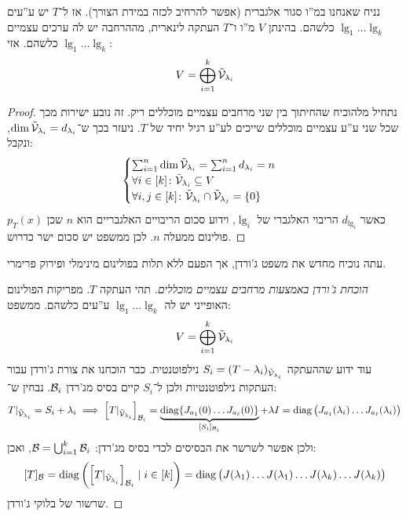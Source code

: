 \documentclass[name=רשימות אלגברה לינארית 2א]{../../../tex/classes/megasumPreamble}
\begin{document}
	
	
	\begin{Theorem}
		נניח שאנחנו במ''ו סגור אלגברית (אפשר להרחיב לכזה במידת הצורך). אז ל־$T$ יש ע''עים $\lg_1 \dots \lg_k$ כלשהם. בהינתן $V$ מ''ו ו־$T$ העתקה לינארית, מההרחבה יש לה ערכים עצמיים $\lg_1 \dots \lg_k$ כלשהם. אזי: 
		\[ V = \bigoplus_{i = 1}^{k} \tilde {\mathcal{V}}_{\lambda_i} \]
	\end{Theorem}
	\begin{proof}
		נתחיל מלהוכיח שהחיתוך בין שני מרחבים עצמיים מוכללים ריק. זה נובע ישירות מכך שכל שני ע''ע עצמיים מוכללים שייכים לע''ע רגיל יחיד של $T$. ניעזר בכך ש־$\dim \tilde {\mathcal{V}}_{\lambda_i} = d_{\lambda_i}$, ונקבל: 
		\[ \begin{cases}
			\sum_{i = 1}^{n} \dim \tilde {\mathcal{V}}_{\lambda_i} = \sum_{i = 1}^{n} d_{\lambda_i} = n \\
			\forall i \in [k] \colon \tilde {\mathcal{V}}_{\lambda_i} \subseteq V \\
			\forall i, j \in [k] \colon \tilde {\mathcal{V}}_{\lambda_i} \cap \tilde {\mathcal{V}}_{\lambda_j} = \{0\}
		\end{cases} \]
		כאשר $d_{\lg_i}$ הריבוי האלגברי של $\lg_i$, וידוע סכום הריבויים האלגבריים הוא $n$ שכן $p_T(x)$ פולינום ממעלה $n$. לכן ממשפט יש סכום ישר כדרוש. 
	\end{proof}
	
	עתה נוכיח מחדש את משפט ג'ורדן, אך הפעם ללא תלות בפולינום מינימלי ופירוק פרימרי. 
	\begin{proof}[הוכחת ג'ורדן באמצעות מרחבים עצמיים מוכללים]
		תהי העתקה $T$. מפריקות הפולינום האופייני יש לה $\lg_1 \dots \lg_k$ ע''עים כלשהם. ממשפט: 
		\[ V = \bigoplus_{i = 1}^{k} \tilde {\mathcal{V}}_{\lambda_i} \]
		עוד ידוע שההעתקה $S_i = (T - \lambda_i)_{\tilde {\mathcal{V}}_{\lambda_i}}$ נילפוטנטית. כבר הוכחנו את צורת ג'ורדן עבור העתקות נילפוטנטיות ולכן ל־$S_i$ קיים בסיס מג'רדן $\mathcal{B}_i$. נבחין ש־: 
		\[ T|_{\tilde {\mathcal{V}}_{\lambda_i}} = S_i + \lambda_i \implies \left [ T|_{\tilde {\mathcal{V}}_{\lambda_i}} \right ]_{\mathcal{B}_i} = \underbrace{\operatorname{diag}\{J_{a_1}(0) \dots J_{a_\ell}(0)\}}_{[S_i]_{\mathcal{B}_i}} + \lambda I = \operatorname{diag}\big(J_{a_1}(\lambda_i) \dots J_{a_\ell}(\lambda_i)\big) \]
		ולכן אפשר לשרשר את הבסיסים לכדי בסיס מג'רדן: $\mathcal{B} = \bigcup_{i = 1}^{k} \mathcal{B}_i$, ואכן: 
		\[ [T]_{\mathcal{B}} = \operatorname{diag}\left ( \left [ T|_{\tilde {\mathcal{V}}_{\lambda_i}} \right ]_{\mathcal{B}_i} \mid i \in [k] \right ) = \operatorname{diag}\big(J(\lambda_1) \dots J(\lambda_1) \dots J(\lambda_k) \dots J(\lambda_k)\big) \]
		שרשור של בלוקי ג'ורדן. 	
	\end{proof}
	
	
\end{document}
